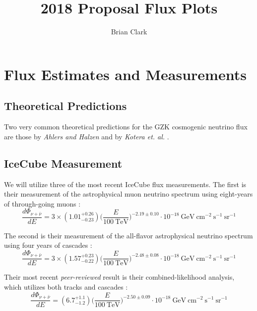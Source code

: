 \documentclass[preprint,12pt]{article}
\begin{document}
\title{2018 Proposal Flux Plots}
\author{Brian Clark}

\maketitle

\section{Flux Estimates and Measurements}

\subsection{Theoretical Predictions}
Two very common theoretical predictions for the GZK cosmogenic neutrino flux are those by \textit{Ahlers and Halzen} \cite{Ahlers:2012rz} and by \textit{Kotera et. al.} \cite{Kotera:2010yn}.

\subsection{IceCube Measurement}


We will utilize three of the most recent IceCube flux measurements. The first is their measurement of the astrophysical muon neutrino spectrum using eight-years of through-going muons \cite{PoS(ICRC2017)1005}:
\begin{equation}
\frac{d \Phi _ {\nu + \bar{\nu}}}{d E} = 3 \times (1.01^{+0.26}_{-0.23}) \Bigg( \frac{E}{100~\textrm{TeV} } \Bigg) ^{-2.19 \pm 0.10} \cdot 10^{-18} ~\textrm{GeV} ~\textrm{cm}^{-2} ~\textrm{s}^{-1} ~\textrm{sr}^{-1}
\end{equation}

The second is their measurement of the all-flavor astrophysical neutrino spectrum using four years of cascades \cite{PoS(ICRC2017)968}:
\begin{equation}
\frac{d \Phi _ {\nu + \bar{\nu}}}{d E} = 3 \times (1.57^{+0.23}_{-0.22}) \Bigg( \frac{E}{100~\textrm{TeV} } \Bigg) ^{-2.48 \pm 0.08} \cdot 10^{-18} ~\textrm{GeV} ~\textrm{cm}^{-2} ~\textrm{s}^{-1} ~\textrm{sr}^{-1}
\end{equation}

Their most recent \textit{peer-reviewed} result is their combined-likelihood analysis, which utilizes both tracks and cascades \cite{Aartsen:2015knd}:
\begin{equation}
\frac{d \Phi _ {\nu + \bar{\nu}}}{d E} = (6.7^{+1.1}_{-1.2}) \Bigg( \frac{E}{100~\textrm{TeV} } \Bigg) ^{-2.50 \pm 0.09} \cdot 10^{-18} ~\textrm{GeV} ~\textrm{cm}^{-2} ~\textrm{s}^{-1} ~\textrm{sr}^{-1}
\end{equation}
\end{document}
